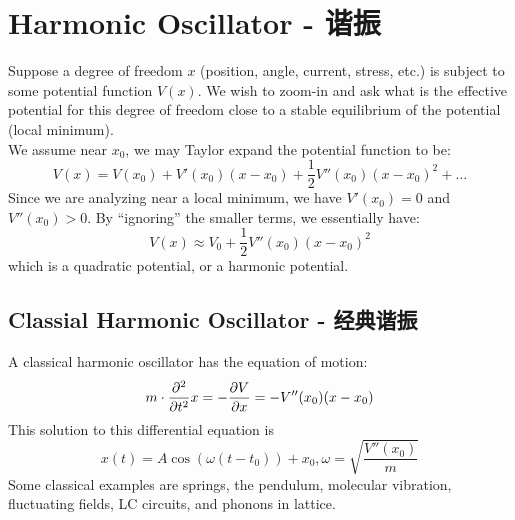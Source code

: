 \section{Harmonic Oscillator - 谐振}
Suppose a degree of freedom $x$ (position, angle, current, stress, etc.) is subject to some potential function $V(x)$. We wish to zoom-in and ask what is the effective potential for this degree of freedom close to a stable equilibrium of the potential (local minimum). \\
We assume near $x_0$, we may Taylor expand the potential function to be:
$$V(x) = V(x_0) + V'(x_0)(x - x_0) + \frac{1}{2}V''(x_0)(x-x_0)^2 + \dots$$
Since we are analyzing near a local minimum, we have $V'(x_0) = 0$ and $V''(x_0) > 0$. By ``ignoring'' the smaller terms, we essentially have:
$$V(x) \approx V_0 + \frac{1}{2}V''(x_0)(x-x_0)^2$$
which is a quadratic potential, or a harmonic potential.

\subsection{Classial Harmonic Oscillator - 经典谐振}
A classical harmonic oscillator has the equation of motion:
$$m \cdot \pdv[2]{t} x = -\pdv{V}{x} = -V''(x_0)(x-x_0)$$
This solution to this differential equation is
$$x(t) = A \cos(\omega(t - t_0)) + x_0, \omega = \sqrt{\frac{V''(x_0)}{m}}$$
Some classical examples are springs, the pendulum, molecular vibration, fluctuating fields, LC circuits, and phonons in lattice.

